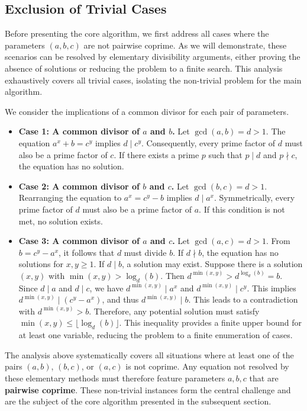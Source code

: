 \documentclass{article}
\begin{document}
\subsection{Exclusion of Trivial Cases}

Before presenting the core algorithm, we first address all cases where the parameters $(a, b, c)$ are not pairwise coprime. As we will demonstrate, these scenarios can be resolved by elementary divisibility arguments, either proving the absence of solutions or reducing the problem to a finite search. This analysis exhaustively covers all trivial cases, isolating the non-trivial problem for the main algorithm.

We consider the implications of a common divisor for each pair of parameters.

\begin{itemize}
    \item \textbf{Case 1: A common divisor of $a$ and $b$.}
    Let $\gcd(a, b) = d > 1$. The equation $a^x + b = c^y$ implies $d \mid c^y$. Consequently, every prime factor of $d$ must also be a prime factor of $c$. If there exists a prime $p$ such that $p \mid d$ and $p \nmid c$, the equation has no solution.

    \item \textbf{Case 2: A common divisor of $b$ and $c$.}
    Let $\gcd(b, c) = d > 1$. Rearranging the equation to $a^x = c^y - b$ implies $d \mid a^x$. Symmetrically, every prime factor of $d$ must also be a prime factor of $a$. If this condition is not met, no solution exists.

    \item \textbf{Case 3: A common divisor of $a$ and $c$.}
    Let $\gcd(a, c) = d > 1$. From $b = c^y - a^x$, it follows that $d$ must divide $b$. If $d \nmid b$, the equation has no solutions for $x, y \ge 1$.
    If $d \mid b$, a solution may exist. Suppose there is a solution $(x,y)$ with $\min(x, y) > \log_d(b)$. Then $d^{\min(x,y)} > d^{\log_d(b)} = b$. Since $d \mid a$ and $d \mid c$, we have $d^{\min(x,y)} \mid a^x$ and $d^{\min(x,y)} \mid c^y$. This implies $d^{\min(x,y)} \mid (c^y - a^x)$, and thus $d^{\min(x,y)} \mid b$. This leads to a contradiction with $d^{\min(x,y)} > b$. Therefore, any potential solution must satisfy $\min(x, y) \le \lfloor\log_d(b)\rfloor$. This inequality provides a finite upper bound for at least one variable, reducing the problem to a finite enumeration of cases.
\end{itemize}

The analysis above systematically covers all situations where at least one of the pairs $(a,b)$, $(b,c)$, or $(a,c)$ is not coprime. Any equation not resolved by these elementary methods must therefore feature parameters $a, b, c$ that are \textbf{pairwise coprime}. These non-trivial instances form the central challenge and are the subject of the core algorithm presented in the subsequent section.
\end{document}
